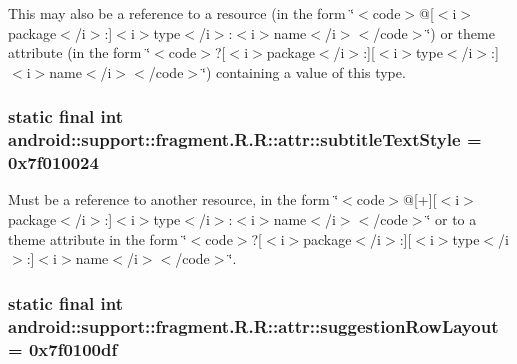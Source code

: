 This may also be a reference to a resource (in the form \char`\"{}$<$code$>$@\mbox{[}$<$i$>$package$<$/i$>$:\mbox{]}$<$i$>$type$<$/i$>$:$<$i$>$name$<$/i$>$$<$/code$>$\char`\"{}) or theme attribute (in the form \char`\"{}$<$code$>$?\mbox{[}$<$i$>$package$<$/i$>$:\mbox{]}\mbox{[}$<$i$>$type$<$/i$>$:\mbox{]}$<$i$>$name$<$/i$>$$<$/code$>$\char`\"{}) containing a value of this type. \hypertarget{classandroid_1_1support_1_1fragment_1_1_r_1_1attr_650d27257284786166cb3f3909d38c77}{
\subsubsection[{subtitleTextStyle}]{\setlength{\rightskip}{0pt plus 5cm}static final int android::support::fragment.R.R::attr::subtitleTextStyle = 0x7f010024}}
\label{classandroid_1_1support_1_1fragment_1_1_r_1_1attr_650d27257284786166cb3f3909d38c77}


Must be a reference to another resource, in the form \char`\"{}$<$code$>$@\mbox{[}+\mbox{]}\mbox{[}$<$i$>$package$<$/i$>$:\mbox{]}$<$i$>$type$<$/i$>$:$<$i$>$name$<$/i$>$$<$/code$>$\char`\"{} or to a theme attribute in the form \char`\"{}$<$code$>$?\mbox{[}$<$i$>$package$<$/i$>$:\mbox{]}\mbox{[}$<$i$>$type$<$/i$>$:\mbox{]}$<$i$>$name$<$/i$>$$<$/code$>$\char`\"{}. \hypertarget{classandroid_1_1support_1_1fragment_1_1_r_1_1attr_20d311212ed9bd28da07836ab5ce862b}{
\subsubsection[{suggestionRowLayout}]{\setlength{\rightskip}{0pt plus 5cm}static final int android::support::fragment.R.R::attr::suggestionRowLayout = 0x7f0100df}}
\label{classandroid_1_1support_1_1fragment_1_1_r_1_1attr_20d311212ed9bd28da07836ab5ce862b}


